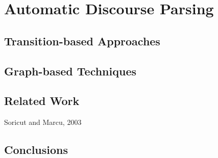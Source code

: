 \chapter{Automatic Discourse Parsing}
\section{Transition-based Approaches}
\section{Graph-based Techniques}
\section{Related Work}
Soricut and Marcu, 2003
\citet{Joty:12}
\citet{Muller:12}
\citet{Luong:13}
\citet{Joty:13}
\citet{Joty:14}
\citet{Heilman:15}
\section{Conclusions}
